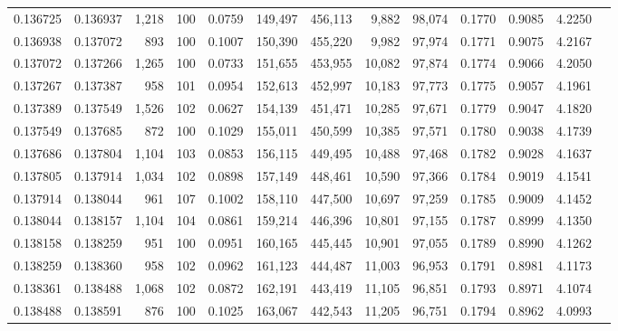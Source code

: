 \begin{tabular}{rrrrrrrrrrrrr}
0.136725 & 0.136937 & 1,218 & 100 &                                     0.0759 & 149,497 & 456,113 &   9,882 &  98,074 & 0.1770 & 0.9085 & 4.2250 \\
0.136938 & 0.137072 &   893 & 100 &                                     0.1007 & 150,390 & 455,220 &   9,982 &  97,974 & 0.1771 & 0.9075 & 4.2167 \\
0.137072 & 0.137266 & 1,265 & 100 &                                     0.0733 & 151,655 & 453,955 &  10,082 &  97,874 & 0.1774 & 0.9066 & 4.2050 \\
0.137267 & 0.137387 &   958 & 101 &                                     0.0954 & 152,613 & 452,997 &  10,183 &  97,773 & 0.1775 & 0.9057 & 4.1961 \\
0.137389 & 0.137549 & 1,526 & 102 &                                     0.0627 & 154,139 & 451,471 &  10,285 &  97,671 & 0.1779 & 0.9047 & 4.1820 \\
0.137549 & 0.137685 &   872 & 100 &                                     0.1029 & 155,011 & 450,599 &  10,385 &  97,571 & 0.1780 & 0.9038 & 4.1739 \\
0.137686 & 0.137804 & 1,104 & 103 &                                     0.0853 & 156,115 & 449,495 &  10,488 &  97,468 & 0.1782 & 0.9028 & 4.1637 \\
0.137805 & 0.137914 & 1,034 & 102 &                                     0.0898 & 157,149 & 448,461 &  10,590 &  97,366 & 0.1784 & 0.9019 & 4.1541 \\
0.137914 & 0.138044 &   961 & 107 &                                     0.1002 & 158,110 & 447,500 &  10,697 &  97,259 & 0.1785 & 0.9009 & 4.1452 \\
0.138044 & 0.138157 & 1,104 & 104 &                                     0.0861 & 159,214 & 446,396 &  10,801 &  97,155 & 0.1787 & 0.8999 & 4.1350 \\
0.138158 & 0.138259 &   951 & 100 &                                     0.0951 & 160,165 & 445,445 &  10,901 &  97,055 & 0.1789 & 0.8990 & 4.1262 \\
0.138259 & 0.138360 &   958 & 102 &                                     0.0962 & 161,123 & 444,487 &  11,003 &  96,953 & 0.1791 & 0.8981 & 4.1173 \\
0.138361 & 0.138488 & 1,068 & 102 &                                     0.0872 & 162,191 & 443,419 &  11,105 &  96,851 & 0.1793 & 0.8971 & 4.1074 \\
0.138488 & 0.138591 &   876 & 100 &                                     0.1025 & 163,067 & 442,543 &  11,205 &  96,751 & 0.1794 & 0.8962 & 4.0993 \\

\end{tabular}
